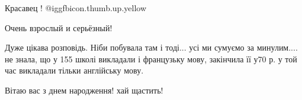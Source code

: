  
 
 
 
 

Красавец !  @igg{fbicon.thumb.up.yellow} 

Очень взрослый и серьёзный!


Дуже цікава розповідь. Ніби побувала там і тоді... усі ми сумуємо за
минулим.... не знала, що у 155 школі викладали і французьку мову, закінчила її у70
р. у той час викладали тільки англійську мову.


Вітаю вас з днем народження! хай щастить!
